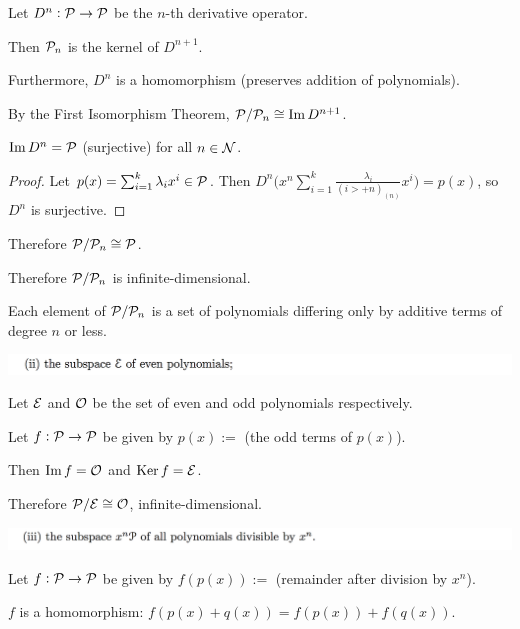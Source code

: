 Let $D^n:\mathcal P \to \mathcal P$ be the $n$-th derivative operator.

Then $\mathcal P_n$ is the kernel of $D^{n+1}$.

Furthermore, $D^n$ is a homomorphism (preserves addition of polynomials).

By the First Isomorphism Theorem, $\mathcal P/\mathcal P_n \cong \operatorname{\mathrm{Im}} D^{n+1}$.

\begin{claim*}
  $\operatorname{\mathrm{Im}} D^n = \mathcal P$ (surjective) for all $n \in \mathcal{N}$.
\end{claim*}

\begin{proof}
  Let $p(x) = \sum_{i=1}^k\lambda_ix^i \in \mathcal P$. Then
  $D^n \Big(x^n\sum_{i=1}^k\frac{\lambda_i}{(i>+n)_{(n)}}x^i\Big) = p(x)$, so $D^n$ is surjective.
\end{proof}

Therefore $\mathcal P/\mathcal P_n \cong \mathcal P$.

Therefore $\mathcal P/\mathcal P_n$ is infinite-dimensional.

\begin{remark*}
  Each element of $\mathcal P/\mathcal P_n$ is a set of polynomials differing only by additive terms
  of degree $n$ or less.
\end{remark*}

\begin{mdframed}
  \includegraphics[width=400pt]{img/linear-algebra-a0-2-2-2.png}
\end{mdframed}
Let $\mathcal E$ and $\mathcal O$ be the set of even and odd polynomials respectively.

Let $f:\mathcal P \to \mathcal P$ be given by $p(x) := $ (the odd terms of $p(x)$).

Then $\operatorname{\mathrm{Im}} f = \mathcal O$ and $\operatorname{\mathrm{Ker}} f = \mathcal E$.

Therefore $\mathcal P/\mathcal E \cong \mathcal O$, infinite-dimensional.


\begin{mdframed}
  \includegraphics[width=400pt]{img/linear-algebra-a0-2-2-3.png}
\end{mdframed}
Let $f: \mathcal P \to \mathcal P$ be given by $f(p(x)) := $ (remainder after division by $x^n$).

\begin{claim*}
  $f$ is a homomorphism: $f(p(x) + q(x)) = f(p(x)) + f(q(x))$.
\end{claim*}


